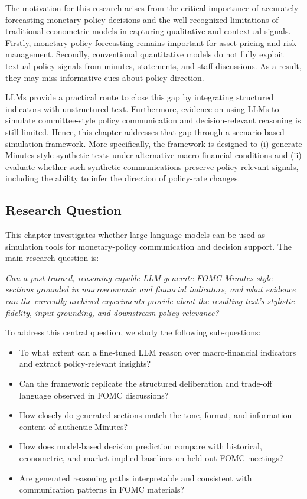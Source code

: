 The motivation for this research arises from the critical importance of accurately forecasting monetary policy decisions and the well-recognized limitations of traditional econometric models in capturing qualitative and contextual signals. Firstly, monetary-policy forecasting remains important for asset pricing and risk management. Secondly, conventional quantitative models do not fully exploit textual policy signals from minutes, statements, and staff discussions. As a result, they may miss informative cues about policy direction.


LLMs provide a practical route to close this gap by integrating structured indicators with unstructured text. Furthermore, evidence on using LLMs to simulate committee-style policy communication and decision-relevant reasoning is still limited. Hence, this chapter addresses that gap through a scenario-based simulation framework. More specifically, the framework is designed to (i) generate Minutes-style synthetic texts under alternative macro-financial conditions and (ii) evaluate whether such synthetic communications preserve policy-relevant signals, including the ability to infer the direction of policy-rate changes.


\subsection*{Research Question}

This chapter investigates whether large language models can be used as simulation tools for monetary-policy communication and decision support. The main research question is:

\textit{Can a post-trained, reasoning-capable LLM generate FOMC-Minutes-style sections grounded in macroeconomic and financial indicators, and what evidence can the currently archived experiments provide about the resulting text's stylistic fidelity, input grounding, and downstream policy relevance?}

To address this central question, we study the following sub-questions:

\begin{itemize}
\item[1.] To what extent can a fine-tuned LLM reason over macro-financial indicators and extract policy-relevant insights?
\item[2.] Can the framework replicate the structured deliberation and trade-off language observed in FOMC discussions?
\item[3.] How closely do generated sections match the tone, format, and information content of authentic Minutes?
\item[4.] How does model-based decision prediction compare with historical, econometric, and market-implied baselines on held-out FOMC meetings?
\item[5.] Are generated reasoning paths interpretable and consistent with communication patterns in FOMC materials?
\end{itemize}


